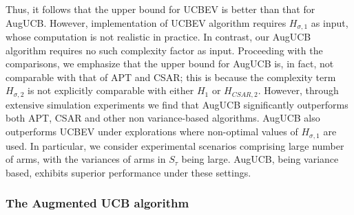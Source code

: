 \documentclass[MS,synopsis]{iitmdiss}
\begin{document}
Thus, it follows that the upper bound for UCBEV \citep{gabillon2011multi} is better than that for AugUCB. However, implementation of UCBEV algorithm requires $H_{\sigma,1}$ as input, whose computation is not realistic in practice. In contrast, our AugUCB algorithm requires no such complexity factor as input. Proceeding with the comparisons, we emphasize that the upper bound for  AugUCB is, in fact, not comparable with that of APT and CSAR; this is because the complexity term $H_{\sigma,2}$ is not explicitly comparable with either $H_1$ or $H_{CSAR,2}$. However, through extensive simulation experiments we find that AugUCB significantly outperforms both APT, CSAR and other non variance-based algorithms. AugUCB also outperforms UCBEV under explorations where non-optimal values of $H_{\sigma,1}$  are used. In particular, we consider experimental scenarios comprising large number of arms, with the variances of arms in $S_\tau$ being large. AugUCB, being variance based, exhibits superior performance under these settings.  

\subsubsection{The Augmented UCB algorithm}
\end{document}
